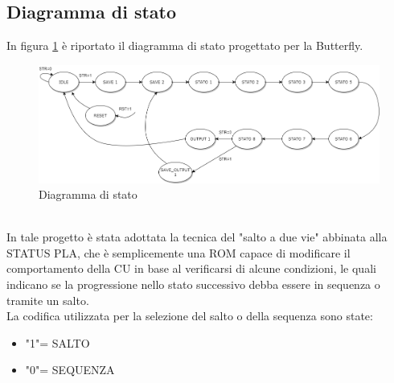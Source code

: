 \documentclass[a4paper, titlepage]{article}
\begin{document}
\subsection{Diagramma di stato}%
In figura \ref{fig:pallogramma} è riportato il diagramma di stato progettato per la Butterfly.
\begin{figure}[h]
    \centering
    \includegraphics[scale=0.4]{Pallogramma.png}
    \caption{Diagramma di stato}
    \label{fig:pallogramma}
\end{figure}\\
\newpage
In tale progetto è stata adottata la tecnica del "salto a due vie" abbinata alla STATUS PLA, che è semplicemente una ROM capace di modificare il comportamento della CU in base al verificarsi di alcune condizioni, le quali indicano se la progressione nello stato successivo debba essere in sequenza o tramite un salto.\\
La codifica utilizzata per la selezione del salto o della sequenza sono state:
\begin{itemize}
    \item "1"= SALTO
    \item "0"= SEQUENZA
\end{itemize}
\end{document}
